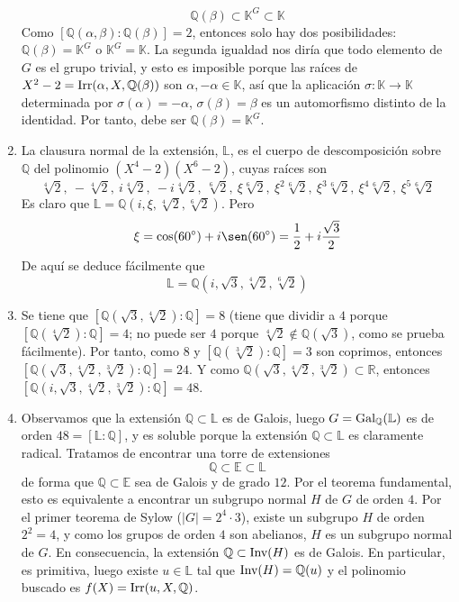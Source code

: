 \documentclass[11pt]{report}
\makeatletter
\renewenvironment{proof}[1][\proofname]{\par
  \pushQED{\qed}%
  \normalfont \topsep\z@skip %
  \trivlist
  \item[\hskip\labelsep
        \itshape
    #1\@addpunct{.}]\ignorespaces
}{%
  \popQED\endtrivlist\@endpefalse
}
\newcommand{\R}{\mathbb R}
\newcommand{\Q}{\mathbb Q}
\newcommand{\E}{\mathbb E}
\newcommand{\K}{\mathbb K}
\renewcommand{\L}{\mathbb L}
\makeatother
\begin{document}
\begin{proof}
\begin{enumerate}
    \[\Q(\beta) \subset \K^G \subset \K\]
    Como $[\Q(\alpha,\beta) \colon \Q(\beta)] = 2$, entonces solo hay dos posibilidades: $\Q(\beta) = \K^G$ o $\K^G=\K$. La segunda igualdad nos diría que todo elemento de $G$ es el grupo trivial, y esto es imposible porque las raíces de $X^2-2 = \textup{Irr}(\alpha,X,\Q(\beta))$ son $\alpha,-\alpha \in \K$, así que la aplicación $\sigma \colon \K \to \K$ determinada por $\sigma(\alpha) = -\alpha$, $\sigma(\beta) = \beta$ es un automorfismo distinto de la identidad. Por tanto, debe ser $\Q(\beta) = \K^G$.
    \item La clausura normal de la extensión, $\L$, es el cuerpo de descomposición sobre $\Q$ del polinomio $(X^4-2)(X^6-2)$, cuyas raíces son
    \[\sqrt[4]{2}, \ -\sqrt[4]{2}, \ i\sqrt[4]{2}, \ -i\sqrt[4]{2}, \ \sqrt[6]{2}, \ \xi\sqrt[6]{2}, \ \xi^2\sqrt[6]{2}, \ \xi^3\sqrt[6]{2}, \ \xi^4\sqrt[6]{2}, \ \xi^5\sqrt[6]{2}\]
    Es claro que $\L = \Q(i,  \xi,\sqrt[4]{2},\sqrt[6]{2})$. Pero
    \[\xi = \cos(60^\circ) +i\sen(60^\circ) = \frac{1}{2}+i\frac{\sqrt{3}}{2}\]
    De aquí se deduce fácilmente que 
    \[\L = \Q( i,  \sqrt{3},\sqrt[4]{2},\sqrt[6]{2})\]
    \item Se tiene que $[\Q(\sqrt{3},\sqrt[4]{2}) \colon \Q] = 8$ (tiene que dividir a $4$ porque $[\Q(\sqrt[4]{2}) \colon \Q] = 4$; no puede ser $4$ porque $\sqrt[4]{2} \not\in \Q(\sqrt{3})$, como se prueba fácilmente). Por tanto, como 8 y $[\Q(\sqrt[3]{2}) \colon \Q] = 3$ son coprimos, entonces $[\Q(\sqrt{3},\sqrt[4]{2}, \sqrt[3]{2}) \colon \Q] = 24$. Y como $\Q(\sqrt{3},\sqrt[4]{2}, \sqrt[3]{2}) \subset \R$, entonces $[\Q(i,\sqrt{3},\sqrt[4]{2}, \sqrt[3]{2}) \colon \Q] = 48$.
    \item Observamos que la extensión $\Q \subset \L$ es de Galois, luego $G=\textup{Gal}_\Q(\L) $ es de orden $48 = [\L \colon \Q]$, y es soluble porque la extensión $\Q \subset \L$ es claramente radical. Tratamos de encontrar una torre de extensiones
    \[\Q \subset \E \subset \L\]
    de forma que $\Q \subset \E$ sea de Galois y de grado $12$. Por el teorema fundamental, esto es equivalente a encontrar un subgrupo normal $H$ de $G$ de orden $4$. Por el primer teorema de Sylow ($|G| = 2^4 \cdot 3$), existe un subgrupo $H$ de orden $2^2 = 4$, y como los grupos de orden $4$ son abelianos, $H$ es un subgrupo normal de $G$. En consecuencia, la extensión $\Q \subset \textup{Inv}(H)$ es de Galois. En particular, es primitiva, luego existe $u \in \L$ tal que $\textup{Inv}(H)=\Q(u)$ y el polinomio buscado es $f(X)=\textup{Irr}(u,X,\Q)$.


\end{enumerate}
\end{proof}
\end{document}
